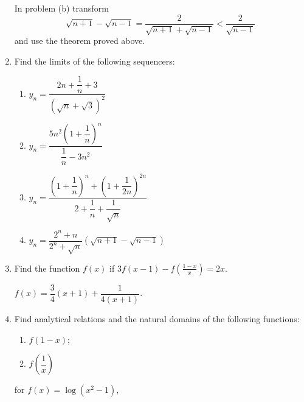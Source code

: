 \begin{enumerate}[label=\textcolor{IndianRed}{Problem \arabic*},leftmargin=2cm]
In problem (b) transform	
\begin{equation*}%
\sqrt{n + 1} - \sqrt{n -1} = \dfrac{2}{\sqrt{n + 1} + \sqrt{n -1}} < \dfrac{2}{\sqrt{n-1}}
\end{equation*}
and	 use the theorem proved above. 

\item Find the limits of the following sequencers:
\begin{enumerate}[label=(\alph*)]
\item $y_{n} =  \dfrac{2n + \dfrac{1}{n} +3}{ \left(\sqrt{n} + \sqrt{3} \right)^{2}}$
\item $y_{n} =  \dfrac{5n^{2} \left( 1 + \dfrac{1}{n} \right)^{n}}{\dfrac{1}{n} - 3n^{2}}$
\item $y_{n} =  \dfrac{\left( 1 + \dfrac{1}{n} \right)^{n} + \left( 1 + \dfrac{1}{2n} \right)^{2n}}{2 + \dfrac{1}{n} + \dfrac{1}{\sqrt{n}}}$
\item $y_{n} =  \dfrac{2^{n} + n}{2^{n} + \sqrt{n}} (\sqrt{n + 1} - \sqrt{n - 1})$
\end{enumerate}

\Answer
{}

\item Find the function $f (x)$ if $3f (x-1)- f \left( \frac{1 -x}{x} \right)=2x$.

\Answer
$f(x)= \dfrac{3}{4} (x+1) + \dfrac{1}{4(x+1)}$.

\item Find analytical relations and the natural domains of the following functions:
\begin{enumerate}[label=(\alph*)]
 \item $f (1 - x)$;
 \item $f \left( \dfrac{1}{x} \right) $
\end{enumerate}
for $f(x) = \log (x^{2} - 1)$, 
 
 \Answer  {}


\end{enumerate}
